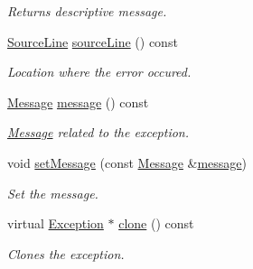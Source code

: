 \begin{DoxyCompactItemize}
\begin{DoxyCompactList}\small\item\em Returns descriptive message. \end{DoxyCompactList}\item 
\hypertarget{class_exception_a67f40ff3ea7f1c07e46222c38dcbaf43}{\hyperlink{class_source_line}{Source\+Line} \hyperlink{class_exception_a67f40ff3ea7f1c07e46222c38dcbaf43}{source\+Line} () const }\label{class_exception_a67f40ff3ea7f1c07e46222c38dcbaf43}

\begin{DoxyCompactList}\small\item\em Location where the error occured. \end{DoxyCompactList}\item 
\hypertarget{class_exception_aab5c1504a18016fdfe7574eb81f59ac6}{\hyperlink{class_message}{Message} \hyperlink{class_exception_aab5c1504a18016fdfe7574eb81f59ac6}{message} () const }\label{class_exception_aab5c1504a18016fdfe7574eb81f59ac6}

\begin{DoxyCompactList}\small\item\em \hyperlink{class_message}{Message} related to the exception. \end{DoxyCompactList}\item 
\hypertarget{class_exception_ad508783fa44767e8fedb6472a4180234}{void \hyperlink{class_exception_ad508783fa44767e8fedb6472a4180234}{set\+Message} (const \hyperlink{class_message}{Message} \&\hyperlink{class_exception_aab5c1504a18016fdfe7574eb81f59ac6}{message})}\label{class_exception_ad508783fa44767e8fedb6472a4180234}

\begin{DoxyCompactList}\small\item\em Set the message. \end{DoxyCompactList}\item 
\hypertarget{class_exception_ad05463060510ad131ccaaafa6b63b2d7}{virtual \hyperlink{class_exception}{Exception} $\ast$ \hyperlink{class_exception_ad05463060510ad131ccaaafa6b63b2d7}{clone} () const }\label{class_exception_ad05463060510ad131ccaaafa6b63b2d7}

\begin{DoxyCompactList}\small\item\em Clones the exception. \end{DoxyCompactList}\end{DoxyCompactItemize}
